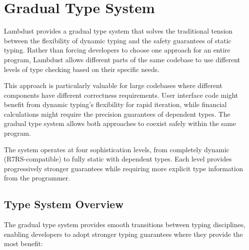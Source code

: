 \chapter{Gradual Type System}
\label{ch:gradual-types}

Lambdust provides a gradual type system that solves the traditional tension between the flexibility of dynamic typing and the safety guarantees of static typing. Rather than forcing developers to choose one approach for an entire program, Lambdust allows different parts of the same codebase to use different levels of type checking based on their specific needs.

This approach is particularly valuable for large codebases where different components have different correctness requirements. User interface code might benefit from dynamic typing's flexibility for rapid iteration, while financial calculations might require the precision guarantees of dependent types. The gradual type system allows both approaches to coexist safely within the same program.

The system operates at four sophistication levels, from completely dynamic (R7RS-compatible) to fully static with dependent types. Each level provides progressively stronger guarantees while requiring more explicit type information from the programmer.

\section{Type System Overview}
\label{sec:type-overview}

The gradual type system provides smooth transitions between typing disciplines, enabling developers to adopt stronger typing guarantees where they provide the most benefit:

